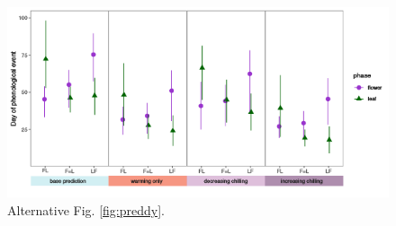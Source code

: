 \documentclass[11pt]{article}
\begin{document}
\begin{figure}[h!]
    \centering
 \includegraphics[width=\textwidth]{..//Plots/Flobuds_manuscript_figs/postergroups.png}
 \caption{Alternative Fig. \ref{fig:preddy}.}
 \end{figure}

\end{document}
